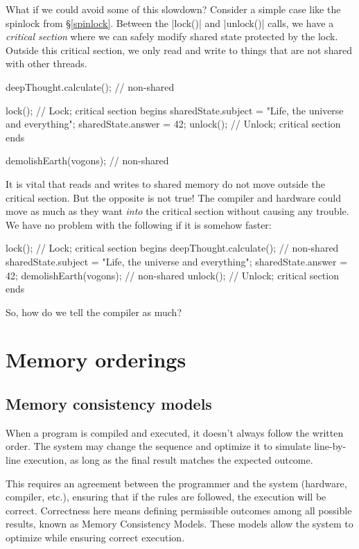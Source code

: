 \documentclass[fontsize=10pt, oneside]{scrartcl}
\newcommand{\introduce}[1]{\textit{#1}}
\newcommand{\secref}[1]{\hyperref[#1]{\textsc{\S}\ref*{#1}}}
\begin{document}
What if we could avoid some of this slowdown?
Consider a simple case like the spinlock from \secref{spinlock}.
Between the \cc|lock()| and \cc|unlock()| calls,
we have a \introduce{critical section} where we can safely modify shared state protected by the lock.
Outside this critical section,
we only read and write to things that are not shared with other threads.
\begin{cppcode}
deepThought.calculate(); // non-shared

lock(); // Lock; critical section begins
sharedState.subject = "Life, the universe and everything";
sharedState.answer = 42;
unlock(); // Unlock; critical section ends

demolishEarth(vogons); // non-shared
\end{cppcode}

It is vital that reads and writes to shared memory do not move outside the critical section.
But the opposite is not true!
The compiler and hardware could move as much as they want \emph{into} the critical section without causing any trouble.
We have no problem with the following if it is somehow faster:
\begin{cppcode}
lock(); // Lock; critical section begins
deepThought.calculate(); // non-shared
sharedState.subject = "Life, the universe and everything";
sharedState.answer = 42;
demolishEarth(vogons); // non-shared
unlock(); // Unlock; critical section ends
\end{cppcode}
So, how do we tell the compiler as much?

\section{Memory orderings}

\subsection{Memory consistency models}

When a program is compiled and executed, it doesn't always follow the written order. The system may change the sequence and optimize it to simulate line-by-line execution, as long as the final result matches the expected outcome.

This requires an agreement between the programmer and the system (hardware, compiler, etc.), ensuring that if the rules are followed, the execution will be correct. Correctness here means defining permissible outcomes among all possible results, known as Memory Consistency Models. These models allow the system to optimize while ensuring correct execution.
\end{document}
